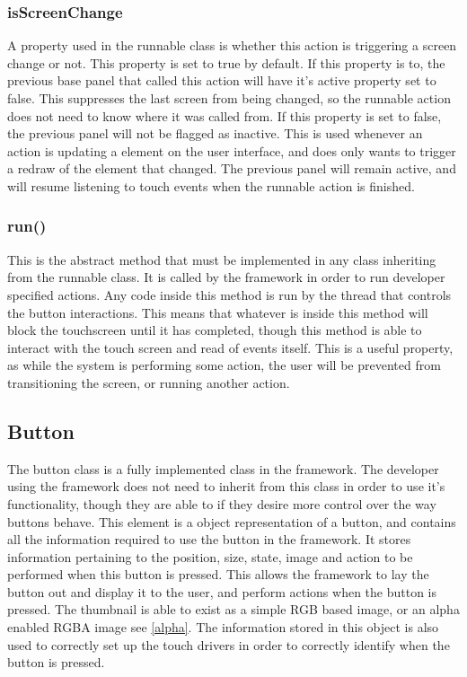 \subsubsection{isScreenChange}

A property used in the runnable class is whether this action is triggering a screen change or not. This property is set to true by default. If this property is to, the previous base panel that called this action will have it's active property set to false. This suppresses the last screen from being changed, so the runnable action does not need to know where it was called from. If this property is set to false, the previous panel will not be flagged as inactive. This is used whenever an action is updating a element on the user interface, and does only wants to trigger a redraw of the element that changed. The previous panel will remain active, and will resume listening to touch events when the runnable action is finished.

\subsubsection{run()}

This is the abstract method that must be implemented in any class inheriting from the runnable class. It is called by the framework in order to run developer specified actions. Any code inside this method is run by the thread that controls the button interactions. This means that whatever is inside this method will block the touchscreen until it has completed, though this method is able to interact with the touch screen and read of events itself. This is a useful property, as while the system is performing some action, the user will be prevented from transitioning the screen, or running another action. 

\subsection{Button}
\label{sec:button}

The button class is a fully implemented class in the framework. The developer using the framework does not need to inherit from this class in order to use it's functionality, though they are able to if they desire more control over the way buttons behave. This element is a object representation of a button, and contains all the information required to use the button in the framework. It stores information pertaining to the position, size, state, image and action to be performed when this button is pressed. This allows the framework to lay the button out and display it to the user, and perform actions when the button is pressed. The thumbnail is able to exist as a simple RGB based image, or an alpha enabled RGBA image see \ref{alpha}. The information stored in this object is also used to correctly set up the touch drivers in order to correctly identify when the button is pressed.


